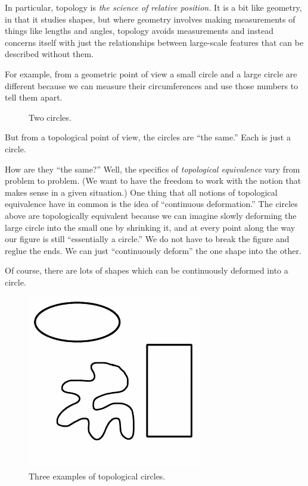 \documentclass[12pt,letterpaper]{article}
\theoremstyle{definition}
\begin{document}
In particular, topology is \emph{the science of relative position.}
It is a bit like geometry, in that it studies shapes, but where geometry involves making measurements of things like lengths and angles, topology avoids measurements and instead concerns itself with just the relationships between large-scale features that can be described without them.

For example, from a geometric point of view a small circle and a large circle are different because we can measure their circumferences and use those numbers to tell them apart.

\begin{figure}[h]
\centering
{}
\caption{Two circles.}
\end{figure}


But from a topological point of view, the circles are ``the same.''
Each is just a circle.

How are they ``the same?''
Well, the specifics of \emph{topological equivalence} vary from problem to problem.
(We want to have the freedom to work with the notion that makes sense in a given situation.)
One thing that all notions of topological equivalence have in common is the idea of ``continuous deformation.''
The circles above are topologically equivalent because we can imagine slowly deforming the large circle into the small one by shrinking it, and at every point along the way our figure is still ``essentially a circle.''
We do not have to break the figure and reglue the ends.
We can just ``continuously deform'' the one shape into the other.

Of course, there are lots of shapes which can be continuously deformed into a circle.

\begin{figure}[h]
\centering
\includegraphics[height=3in]{phppics/topcircle.png}
\caption{Three examples of  topological circles.}
\end{figure}
\end{document}
